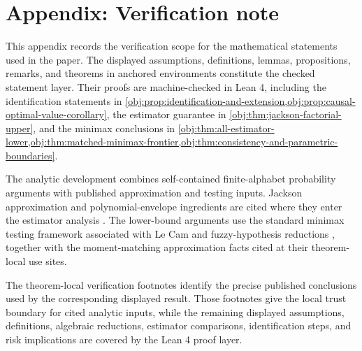 \section{Appendix: Verification note}

This appendix records the verification scope for the mathematical statements used in the paper. The displayed assumptions, definitions, lemmas, propositions, remarks, and theorems in anchored environments constitute the checked statement layer. Their proofs are machine-checked in Lean 4, including the identification statements in \cref{obj:prop:identification-and-extension,obj:prop:causal-optimal-value-corollary}, the estimator guarantee in \cref{obj:thm:jackson-factorial-upper}, and the minimax conclusions in \cref{obj:thm:all-estimator-lower,obj:thm:matched-minimax-frontier,obj:thm:consistency-and-parametric-boundaries}.

The analytic development combines self-contained finite-alphabet probability arguments with published approximation and testing inputs. Jackson approximation and polynomial-envelope ingredients are cited where they enter the estimator analysis \citep{DeVore1993,CaiLow2011L1}. The lower-bound arguments use the standard minimax testing framework associated with Le Cam and fuzzy-hypothesis reductions \citep{LeCam1986,Tsybakov2009}, together with the moment-matching approximation facts cited at their theorem-local use sites.

The theorem-local verification footnotes identify the precise published conclusions used by the corresponding displayed result. Those footnotes give the local trust boundary for cited analytic inputs, while the remaining displayed assumptions, definitions, algebraic reductions, estimator comparisons, identification steps, and risk implications are covered by the Lean 4 proof layer.
